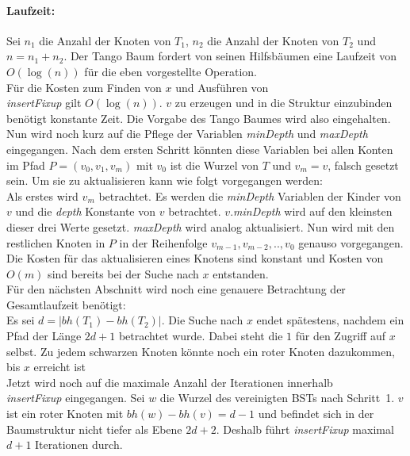 \documentclass[a4paper,12pt]{article}
\begin{document}
\paragraph{Laufzeit:}
Sei $n_1$ die Anzahl der Knoten von $T_1$, $n_2$ die Anzahl der Knoten von $T_2$ und $n = n_1 + n_2$. Der Tango Baum fordert von seinen Hilfsbäumen eine Laufzeit von $O(\log \left(n\right))$ für die eben vorgestellte Operation.\\ Für die Kosten zum Finden von $x$ und Ausführen von \\ \textit{insertFixup}  gilt $O(\log (n))$. $v$ zu erzeugen und in die Struktur einzubinden benötigt konstante Zeit. 
Die Vorgabe des Tango Baumes wird also eingehalten.\\
Nun wird noch kurz auf die Pflege der Variablen  \textit{minDepth} und \textit{maxDepth} eingegangen. Nach dem ersten Schritt könnten diese Variablen bei allen Konten im Pfad $P = \left(v_0, v_1, v_m\right)$ mit $v_0$ ist die Wurzel von $T$ und $v_m = v$, falsch gesetzt sein. Um sie zu aktualisieren kann wie folgt vorgegangen werden:\\
 Als erstes wird $v_m$ betrachtet. Es werden die \textit{minDepth} Variablen der Kinder von $v$ und die \textit{depth} Konstante von $v$ betrachtet. $v$.\textit{minDepth} wird auf den kleinsten dieser drei Werte gesetzt. \textit{maxDepth} wird analog aktualisiert. Nun wird mit den restlichen Knoten in $P$ in der Reihenfolge $v_{m-1}, v_{m-2},..,v_0$ genauso vorgegangen. Die Kosten für das aktualisieren eines Knotens sind konstant und Kosten von $O\left(m\right)$ sind bereits bei der Suche nach $x$ entstanden. \\   
Für den nächsten Abschnitt wird noch eine genauere Betrachtung der Gesamtlaufzeit benötigt:\\ Es sei $d = \vert \mathit{bh}(T_1) - \mathit{bh}(T_2)  \vert $. Die Suche nach $x$ endet spätestens, nachdem ein Pfad der Länge $2d + 1$ betrachtet wurde. Dabei steht die $1$ für den Zugriff auf $x$ selbst. Zu jedem schwarzen Knoten könnte noch ein roter Knoten dazukommen, bis $x$ erreicht ist\\
 Jetzt wird noch auf die maximale Anzahl der Iterationen innerhalb \\ \textit{insertFixup} eingegangen.
 Sei $w$ die Wurzel des vereinigten BSTs nach \mbox{Schritt 1}. $v$ ist ein roter Knoten mit $\mathit{bh}(w) - \mathit{bh}(v) = d - 1$ und befindet sich in der Baumstruktur nicht tiefer als Ebene $2d + 2$. Deshalb führt \textit{insertFixup} maximal $d + 1$ Iterationen durch.  
\end{document}
